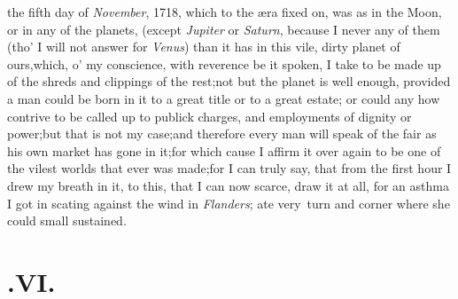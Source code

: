 \documentclass{article}
\begin{document}
 the fifth day of \textit{November},
1718, which to the æra fixed on, was as\break 
{}
\break
{}
in the Moon, or in any of the
planets, (except \textit{Jupiter} or \textit{Saturn}, because I never
 any of them (tho’ I will not answer for \textit{Venus})
than it has in this vile, dirty pla\-net of ours,\tsk  which,
o’ my conscience, with reverence be it spoken, I take to be
made up of the shreds and clippings of the rest;\tsh  not
but the planet is well enough, provided a man could be born in it
to a great title or to a great estate; or could any how contrive to
be called up to publick charges, and employments of dignity or
power;\tsh  but that is not my case;\tsh  and
therefore every man will speak of the fair as his own market has
gone in it;\tsk  for which cause I affirm it over
again to be one of the vilest worlds that ever was made;\tsk  for
I can truly say, that from the first hour I drew my breath in it,
to this, that I can now scarce, draw it at all, for an asthma I got
in scating against the wind in \textit{Flanders};\tsk\break
{}
ate very\sic\ turn and corner where she could 
small  sustained.

\null
\section{.\enspace VI.}
\end{document}
